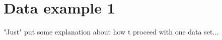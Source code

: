 
\chapter{Data example 1}
\label{sec:data_ex1}
\minitoc

"Just" put some explanation about how t proceed with one data set...
